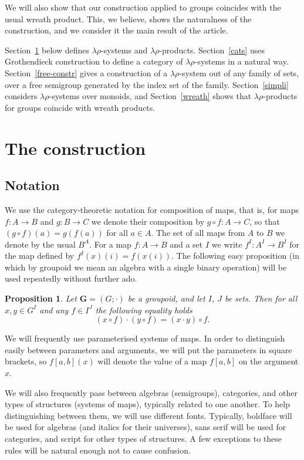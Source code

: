 \documentclass{amsart}
\newtheorem{proposition}{Proposition}
\begin{document}
We will also show that our construction applied to groups coincides with the
usual wreath product. This, we believe, shows the naturalness of the
construction, and we consider it the main result of the article. 

Section~\ref{constr} below defines $\lambda\rho$-systems and
$\lambda\rho$-products.  Section~\ref{cats} uses Grothendieck construction
to define a category of $\lambda\rho$-systems in a natural way.
Section~\ref{free-constr} gives a construction of a $\lambda\rho$-system
out of any family of sets, over a free semigroup generated by the index set
of the family. 
Section~\ref{simpli} considers $\lambda\rho$-systems over monoids, and
Section~\ref{wreath} shows that
$\lambda\rho$-products for groups coincide with wreath products. 

\section{The construction}\label{constr}


\subsection{Notation}
We use the category-theoretic notation for composition of maps, that is, 
for maps $f\colon A\longrightarrow B$ and $g\colon B\longrightarrow C$
we denote their composition by $g\circ f\colon A\longrightarrow C$, so that
$(g\circ f)(a) = g(f(a))$ for all $a\in A$. The set of all
maps from $A$ to $B$ we denote by the usual $B^A$. For a map
$f\colon A\longrightarrow B$ and a set $I$ we write
$f^I\colon A^I\to B^I$ for the map defined by $f^I(x)(i)=f(x(i))$.
The following easy proposition (in which by groupoid we mean
an algebra with a single binary operation) will be used repeatedly without further ado.


\begin{proposition}\label{P1}
Let $\mathbf{G} = (G;\cdot)$ be a groupoid, and let $I$, $J$ be sets. 
Then for all $x,y\in G^I$ and any $f\in I^J$ the following equality holds
$$(x\circ f)\cdot (y\circ f)= (x\cdot y)\circ f.$$
\end{proposition}

We will frequently use parameterised systems of maps. In order to
distinguish easily between parameters and arguments, we will put the parameters
in square brackets, so $f[a,b](x)$ will denote the value of a
map $f[a,b]$ on the argument $x$.

We will also frequently pass between algebras (semigroups), categories, and
other types of structures (systems of maps), typically related to one
another. To help distinguishing between them, we will use different fonts.
Typically, boldface will be used for algebras (and italics for their
universes), sans serif will be used for categories, and script for other types
of structures. A few exceptions to these rules will be natural enough not to
cause confusion.
\end{document}
